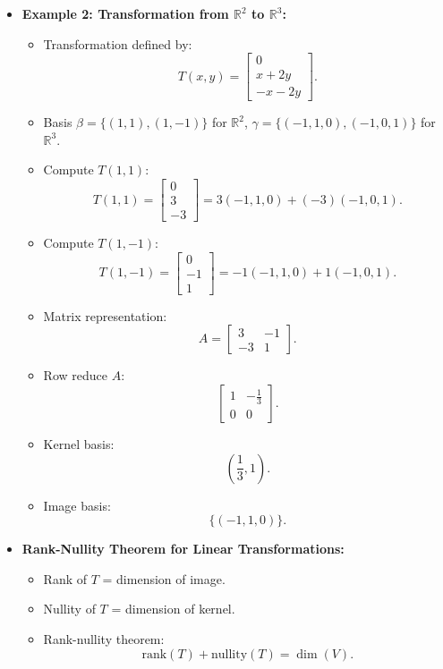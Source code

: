 \documentclass{article}
\begin{document}
\begin{itemize}
  \item \textbf{Example 2: Transformation from $\mathbb{R}^2$ to $\mathbb{R}^3$:}
    \begin{itemize}
      \item Transformation defined by:
        \[
          T(x, y) =
          \begin{bmatrix}
            0 \\
            x + 2y \\
            -x - 2y
          \end{bmatrix}.
        \]
      \item Basis $\beta = \{(1, 1), (1, -1)\}$ for $\mathbb{R}^2$, $\gamma = \{(-1, 1, 0), (-1, 0, 1)\}$ for $\mathbb{R}^3$.
      \item Compute $T(1, 1)$:
        \[
          T(1, 1) =
          \begin{bmatrix}
            0 \\
            3 \\
            -3
          \end{bmatrix} = 3(-1, 1, 0) + (-3)(-1, 0, 1).
        \]
      \item Compute $T(1, -1)$:
        \[
          T(1, -1) =
          \begin{bmatrix}
            0 \\
            -1 \\
            1
          \end{bmatrix} = -1(-1, 1, 0) + 1(-1, 0, 1).
        \]
      \item Matrix representation:
        \[
          A =
          \begin{bmatrix}
            3 & -1 \\
            -3 & 1
          \end{bmatrix}.
        \]
      \item Row reduce $A$:
        \[
          \begin{bmatrix}
            1 & -\frac{1}{3} \\
            0 & 0
          \end{bmatrix}.
        \]
      \item Kernel basis:
        \[
          \left(\frac{1}{3}, 1\right).
        \]
      \item Image basis:
        \[
          \{(-1, 1, 0)\}.
        \]
    \end{itemize}

  \item \textbf{Rank-Nullity Theorem for Linear Transformations:}
    \begin{itemize}
      \item Rank of $T$ = dimension of image.
      \item Nullity of $T$ = dimension of kernel.
      \item Rank-nullity theorem:
        \[
          \text{rank}(T) + \text{nullity}(T) = \dim(V).
        \]
    \end{itemize}
\end{itemize}
\end{document}
